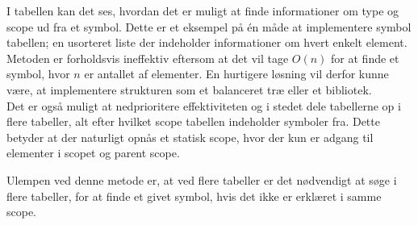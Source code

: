 \noindent I tabellen kan det ses, hvordan det er muligt at finde informationer om type og scope ud fra et symbol. Dette er et eksempel på én måde at implementere symbol tabellen; en usorteret liste der indeholder informationer om hvert enkelt element. Metoden er forholdsvis ineffektiv eftersom at det vil tage $O(n)$ for at finde et symbol, hvor $n$ er antallet af elementer. En hurtigere løsning vil derfor kunne være, at implementere strukturen som et balanceret træ eller et bibliotek.\\

\noindent Det er også muligt at nedprioritere effektiviteten og i stedet dele tabellerne op i flere tabeller, alt efter hvilket scope tabellen indeholder symboler fra. Dette betyder at der naturligt opnås et statisk scope, hvor der kun er adgang til elementer i scopet og parent scope.

    
    
\noindent Ulempen ved denne metode er, at ved flere tabeller er det nødvendigt at søge i flere tabeller, for at finde et givet symbol, hvis det ikke er erklæret i samme scope.
    
